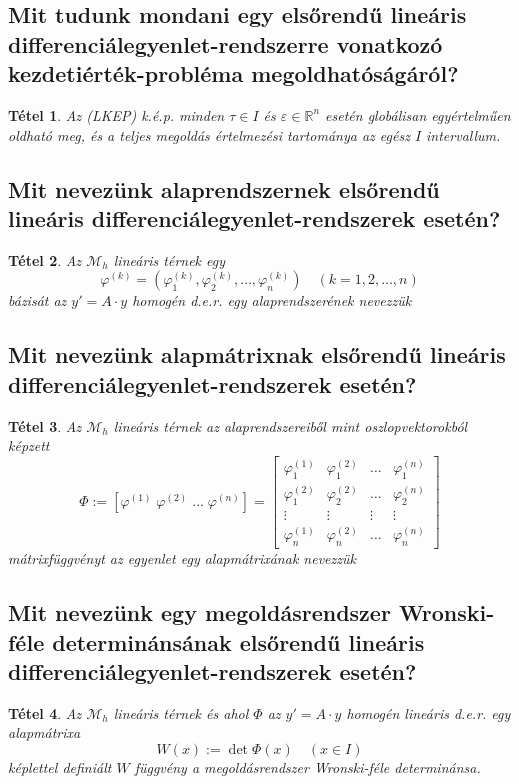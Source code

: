 \documentclass[12pt,a4paper]{article}
\newcommand{\R}{\mathbb{R}}
\newcommand{\f}{\varphi}
\newcommand{\bb}[1]{\left( #1 \right)}
\newcommand{\boxes}[1]{\left[ #1 \right]}
\newtheorem{tet}{Tétel}[section]
\begin{document}
\subsection{Mit tudunk mondani egy elsőrendű lineáris differenciálegyenlet-rendszerre vonatkozó kezdetiérték-probléma megoldhatóságáról?}
\begin{tet}
Az (LKEP) k.é.p. minden $\tau \in I$ és $\varepsilon \in \R^n$ esetén globálisan egyértelműen oldható meg, és a teljes megoldás értelmezési tartománya az egész $I$ intervallum.
\end{tet}
\subsection{Mit nevezünk alaprendszernek elsőrendű lineáris differenciálegyenlet-rendszerek esetén?}
\begin{tet}
Az $\mathcal{M}_h$ lineáris térnek egy
\[
\f^{(k)} = \bb{\f_1^{(k)},\f_2^{(k)},\ldots,\f_n^{(k)}} \quad  \bb{k= 1,2,\ldots,n}
\]
bázisát az $y' = A \cdot y$ homogén d.e.r. egy alaprendszerének nevezzük
\end{tet}
\subsection{Mit nevezünk alapmátrixnak elsőrendű lineáris differenciálegyenlet-rendszerek esetén?}
\begin{tet}
Az $\mathcal{M}_h$ lineáris térnek az alaprendszereiből mint oszlopvektorokból képzett
\[
\Phi := \boxes{\f^{(1)} \; \f^{(2)} \; \ldots \; \f^{(n)}} = \begin{bmatrix}
\f_1^{(1)} & \f_1^{(2)} & \ldots & \f_1^{(n)} \\
\f_1^{(2)} & \f_2^{(2)} & \ldots & \f_2^{(n)} \\
\vdots & \vdots & \vdots & \vdots \\
\f_n^{(1)} & \f_n^{(2)} & \ldots & \f_n^{(n)}
\end{bmatrix}
\]
mátrixfüggvényt az egyenlet egy alapmátrixának nevezzük
\end{tet}
\subsection{Mit nevezünk egy megoldásrendszer Wronski-féle determinánsának elsőrendű lineáris differenciálegyenlet-rendszerek esetén?}
\begin{tet}
Az $\mathcal{M}_h$ lineáris térnek és ahol $\Phi$ az $y' = A \cdot y$ homogén lineáris d.e.r. egy alapmátrixa
\[
W(x) := \det \Phi(x) \quad \bb{x \in I}
\]
képlettel definiált $W$ függvény a megoldásrendszer Wronski-féle determinánsa.
\end{tet}
\end{document}
